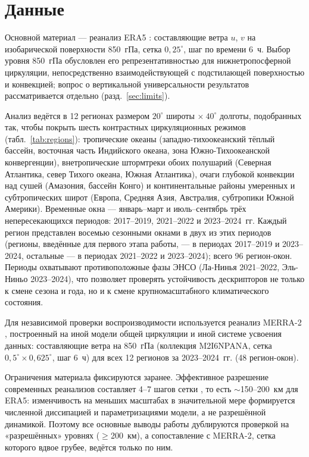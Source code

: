 \documentclass[11pt,a4paper]{article}
\begin{document}
\section{Данные}
\label{sec:data}

Основной материал --- реанализ ERA5 \cite{Hersbach2020,Soci2024}: составляющие ветра $u$, $v$ на изобарической поверхности 850~гПа, сетка $0{,}25^\circ$, шаг по времени 6~ч. Выбор уровня 850~гПа обусловлен его репрезентативностью для нижнетропосферной циркуляции, непосредственно взаимодействующей с подстилающей поверхностью и конвекцией; вопрос о вертикальной универсальности результатов рассматривается отдельно (разд.~\ref{sec:limits}).

Анализ ведётся в 12 регионах размером $20^\circ$ широты $\times\ 40^\circ$ долготы, подобранных так, чтобы покрыть шесть контрастных циркуляционных режимов (табл.~\ref{tab:regions}): тропические океаны (западно-тихоокеанский тёплый бассейн, восточная часть Индийского океана, зона Южно-Тихоокеанской конвергенции), внетропические штормтреки обоих полушарий (Северная Атлантика, север Тихого океана, Южная Атлантика), очаги глубокой конвекции над сушей (Амазония, бассейн Конго) и континентальные районы умеренных и субтропических широт (Европа, Средняя Азия, Австралия, субтропики Южной Америки). Временные окна --- январь--март и июль--сентябрь трёх непересекающихся периодов: 2017--2019, 2021--2022 и 2023--2024~гг. Каждый регион представлен восемью сезонными окнами в двух из этих периодов (регионы, введённые для первого этапа работы, --- в периодах 2017--2019 и 2023--2024, остальные --- в периодах 2021--2022 и 2023--2024); всего 96 регион-окон. Периоды охватывают противоположные фазы ЭНСО (Ла-Нинья 2021--2022, Эль-Ниньо 2023--2024), что позволяет проверять устойчивость дескрипторов не только к смене сезона и года, но и к смене крупномасштабного климатического состояния.

Для независимой проверки воспроизводимости используется реанализ MERRA-2 \cite{Gelaro2017}, построенный на иной модели общей циркуляции и иной системе усвоения данных: составляющие ветра на 850~гПа (коллекция M2I6NPANA, сетка $0{,}5^\circ\times0{,}625^\circ$, шаг 6~ч) для всех 12 регионов за 2023--2024~гг. (48 регион-окон).

Ограничения материала фиксируются заранее. Эффективное разрешение современных реанализов составляет 4--7 шагов сетки \cite{Skamarock2004,Bolgiani2022}, то есть $\sim$150--200~км для ERA5: изменчивость на меньших масштабах в значительной мере формируется численной диссипацией и параметризациями модели, а не разрешённой динамикой. Поэтому все основные выводы работы дублируются проверкой на «разрешённых» уровнях ($\geq$200~км), а сопоставление с MERRA-2, сетка которого вдвое грубее, ведётся только по ним.
\end{document}
